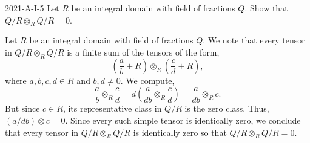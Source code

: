\documentclass{article}
\begin{document}
	
	\begin{prb}{2021-A-I-5}
		Let $R$ be an integral domain with field of fractions $Q$. Show that $Q/R \otimes_{R} Q/R = 0$. 
	\end{prb}
	Let $R$ be an integral domain with field of fractions $Q$. We note that every tensor in $Q/R \otimes_{R} Q/R$ is a finite sum of the tensors of the form,
	\begin{equation*}
		\left(\frac{a}{b} + R\right) \otimes_{R} \left(\frac{c}{d} + R\right), 
	\end{equation*}
	where $a, b, c, d \in R$ and $b, d \neq 0$. We compute, 
	\begin{equation*}
		\frac{a}{b} \otimes_{R} \frac{c}{d} = d\left(\frac{a}{db} \otimes_{R} \frac{c}{d}\right) = \frac{a}{db} \otimes_{R}c. 
	\end{equation*}
	But since $c \in R$, its representative class in $Q/R$ is the zero class. Thus, $(a/db) \otimes c= 0$. Since every such simple tensor is identically zero, we conclude that every tensor in $Q/R \otimes_{R} Q/R$ is identically zero so that $Q/R \otimes_{R} Q/R = 0$. 
	
\end{document}
